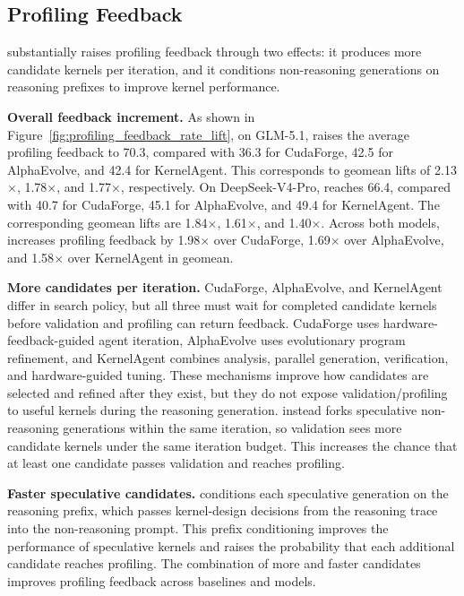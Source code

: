 \subsection{Profiling Feedback}\label{subsec:eval_success_rate}

\sysname{} substantially raises profiling feedback through two effects:
it produces more candidate kernels per iteration, and it conditions
non-reasoning generations on reasoning prefixes to improve kernel performance.

\noindent\textbf{Overall feedback increment.}
As shown in Figure~\ref{fig:profiling_feedback_rate_lift}, on GLM-5.1, \sysname{} raises the average profiling feedback to 70.3,
compared with 36.3 for CudaForge, 42.5 for AlphaEvolve, and 42.4 for
KernelAgent.
This corresponds to geomean lifts of 2.13$\times$, 1.78$\times$, and
1.77$\times$, respectively.
On DeepSeek-V4-Pro, \sysname{} reaches 66.4, compared with 40.7 for
CudaForge, 45.1 for AlphaEvolve, and 49.4 for KernelAgent.
The corresponding geomean lifts are 1.84$\times$, 1.61$\times$, and
1.40$\times$.
Across both models, \sysname{} increases profiling feedback by
1.98$\times$ over CudaForge, 1.69$\times$ over AlphaEvolve, and 1.58$\times$
over KernelAgent in geomean.

\noindent\textbf{More candidates per iteration.}
CudaForge, AlphaEvolve, and KernelAgent differ in search policy, but all three
must wait for completed candidate kernels before validation and profiling can
return feedback.
CudaForge uses hardware-feedback-guided agent iteration, AlphaEvolve uses
evolutionary program refinement, and KernelAgent combines analysis, parallel
generation, verification, and hardware-guided tuning.
These mechanisms improve how candidates are selected and refined after they
exist, but they do not expose validation/profiling to useful kernels during the
reasoning generation.
\sysname{} instead forks speculative non-reasoning generations within the same
iteration, so validation sees more candidate kernels under the same iteration
budget.
This increases the chance that at least one candidate passes validation and
reaches profiling.

\noindent\textbf{Faster speculative candidates.}
\sysname{} conditions each speculative generation on the reasoning prefix, which
passes kernel-design decisions from the reasoning trace into the
non-reasoning prompt.
This prefix conditioning improves the performance of speculative kernels and raises
the probability that each additional candidate reaches profiling.
The combination of more and faster candidates improves profiling
feedback across baselines and models.

